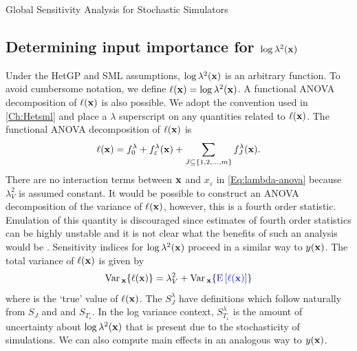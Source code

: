 \begin{chapter}{Global Sensitivity Analysis for Stochastic Simulators\label{Ch:sensitivity}}
\subsection{Determining input importance for $\log \lambda^2(\mathbf{x})$}
Under the HetGP and SML assumptions, $\log \lambda^2(\mathbf{x})$ is an arbitrary function. To avoid cumbersome notation, we define $\ell(\mathbf{x}) = \log \lambda^2 (\mathbf{x})$. A functional ANOVA decomposition of $\ell(\mathbf{x})$ is also possible. We adopt the convention used in \cref{Ch:Hetsml} and place a $\lambda$ superscript on any quantities related to $\ell(\mathbf{x})$. The functional ANOVA decomposition of $\ell(\mathbf{x})$ is
\begin{equation}
\ell(\mathbf{x}) = f^{\lambda}_0 + f^{\lambda}_\varepsilon (\mathbf{x}) + \sum_{J\subseteq \{ 1, 2, \ldots, m\}} f^{\lambda}_J(\mathbf{x}) . \label{Eq:lambda-anova}
\end{equation}
There are no interaction terms between $\mathbf{x}$ and $x_\varepsilon$ in \cref{Eq:lambda-anova} because  $\lambda^2_V$ is assumed constant. It would be possible to construct an ANOVA decomposition of the variance of $\ell(\mathbf{x})$, however, this is a fourth order statistic. Emulation of this quantity is discouraged since estimates of fourth order statistics can be highly unstable and it is not clear what the benefits of such an analysis would be \citep{Andrianakis2017}.
Sensitivity indices for $\log \lambda^2(\mathbf{x})$ proceed in a similar way to $y(\mathbf{x})$. The total variance of $\ell(\mathbf{x})$ is given by
\begin{equation}
\mathrm{Var}\,_{\mathbf{x}} \{ \ell(\mathbf{x})\} = \lambda^2_V + \mathrm{Var}\,_{\mathbf{x}} \{\textcolor{blue}{ \textrm{E}\, [ \ell(\mathbf{x}) ] }  \}
\end{equation}
where \correction{$\E \{ \ell(\bx) \} $} is the `true' value of $\ell (\mathbf{x})$. The $S^{\lambda}_J$ have definitions which follow naturally from $S_J$ and and $S_{T_\varepsilon}$. In the log variance context, $S^{\lambda}_{T_\varepsilon}$ is the amount of uncertainty about $\log \lambda^2(\mathbf{x})$ that is present due to the stochasticity of simulations. We can also compute main effects in an analogous way to $y(\mathbf{x})$.

\end{chapter}
